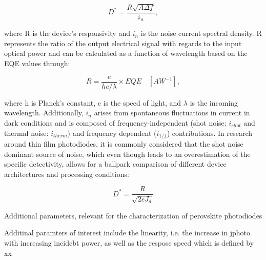\begin{equation}
    D^* = \frac{R\sqrt{A\Delta f}}{i_n},
\end{equation}

where R is the device's responsivity and $i_n$ is the noise current spectral density. R represents the ratio of the output electrical signal with regards to the input optical power and can be calculated as a function of wavelength based on the EQE values through: 

\begin{equation}
    R = \frac{e}{hc/\lambda} \times EQE \quad [AW^{-1}],    
\end{equation}

where h is Planck's constant, c is the speed of light, and $\lambda$ is the incoming wavelength. Additionally, $i_n$ arises from spontaneous fluctuations in current in dark conditions and is composed of frequency-independent (shot noise: $i_{shot}$ and thermal noise: $i_{therm}$) and 
frequency dependent ($i_{1/f}$) contributions. In research around thin film photodiodes, it is commonly considered that the shot noise dominant source of noise, which even though leads to an overestimation of the specific detectivity, allows for a ballpark comparison of different device architectures and processing conditions:  

\begin{equation}
    D^* = \frac{R}{\sqrt{2eJ_d}}
\end{equation}  

Additional parameters, relevant for the characterization of perovskite photodiodes 

Additinal paramters of interest include the linearity, i.e. the increase in jphoto with increasing incidebt power, as well as the respose speed which is defined by xx



\cleardoublepage

